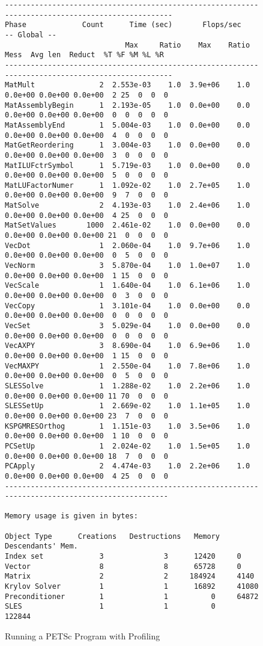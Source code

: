 \begin{figure}[H]
{\begin{verbatim}
--------------------------------------------------------------------------------------------------
Phase             Count      Time (sec)       Flops/sec                             -- Global --    
                            Max     Ratio    Max    Ratio   Mess  Avg len  Reduct  %T %F %M %L %R   
--------------------------------------------------------------------------------------------------
MatMult               2  2.553e-03    1.0  3.9e+06    1.0  0.0e+00 0.0e+00 0.0e+00  2 25  0  0  0
MatAssemblyBegin      1  2.193e-05    1.0  0.0e+00    0.0  0.0e+00 0.0e+00 0.0e+00  0  0  0  0  0
MatAssemblyEnd        1  5.004e-03    1.0  0.0e+00    0.0  0.0e+00 0.0e+00 0.0e+00  4  0  0  0  0
MatGetReordering      1  3.004e-03    1.0  0.0e+00    0.0  0.0e+00 0.0e+00 0.0e+00  3  0  0  0  0
MatILUFctrSymbol      1  5.719e-03    1.0  0.0e+00    0.0  0.0e+00 0.0e+00 0.0e+00  5  0  0  0  0
MatLUFactorNumer      1  1.092e-02    1.0  2.7e+05    1.0  0.0e+00 0.0e+00 0.0e+00  9  7  0  0  0
MatSolve              2  4.193e-03    1.0  2.4e+06    1.0  0.0e+00 0.0e+00 0.0e+00  4 25  0  0  0
MatSetValues       1000  2.461e-02    1.0  0.0e+00    0.0  0.0e+00 0.0e+00 0.0e+00 21  0  0  0  0
VecDot                1  2.060e-04    1.0  9.7e+06    1.0  0.0e+00 0.0e+00 0.0e+00  0  5  0  0  0
VecNorm               3  5.870e-04    1.0  1.0e+07    1.0  0.0e+00 0.0e+00 0.0e+00  1 15  0  0  0
VecScale              1  1.640e-04    1.0  6.1e+06    1.0  0.0e+00 0.0e+00 0.0e+00  0  3  0  0  0
VecCopy               1  3.101e-04    1.0  0.0e+00    0.0  0.0e+00 0.0e+00 0.0e+00  0  0  0  0  0
VecSet                3  5.029e-04    1.0  0.0e+00    0.0  0.0e+00 0.0e+00 0.0e+00  0  0  0  0  0
VecAXPY               3  8.690e-04    1.0  6.9e+06    1.0  0.0e+00 0.0e+00 0.0e+00  1 15  0  0  0
VecMAXPY              1  2.550e-04    1.0  7.8e+06    1.0  0.0e+00 0.0e+00 0.0e+00  0  5  0  0  0
SLESSolve             1  1.288e-02    1.0  2.2e+06    1.0  0.0e+00 0.0e+00 0.0e+00 11 70  0  0  0
SLESSetUp             1  2.669e-02    1.0  1.1e+05    1.0  0.0e+00 0.0e+00 0.0e+00 23  7  0  0  0
KSPGMRESOrthog        1  1.151e-03    1.0  3.5e+06    1.0  0.0e+00 0.0e+00 0.0e+00  1 10  0  0  0
PCSetUp               1  2.024e-02    1.0  1.5e+05    1.0  0.0e+00 0.0e+00 0.0e+00 18  7  0  0  0
PCApply               2  4.474e-03    1.0  2.2e+06    1.0  0.0e+00 0.0e+00 0.0e+00  4 25  0  0  0
-------------------------------------------------------------------------------------------------

Memory usage is given in bytes:

Object Type      Creations   Destructions   Memory  Descendants' Mem.
Index set             3              3      12420     0
Vector                8              8      65728     0
Matrix                2              2     184924     4140
Krylov Solver         1              1      16892     41080
Preconditioner        1              1          0     64872
SLES                  1              1          0     122844

\end{verbatim}
}
\nobreak
\caption{Running a PETSc Program with Profiling}
\label{fig:exprof}
\end{figure}

